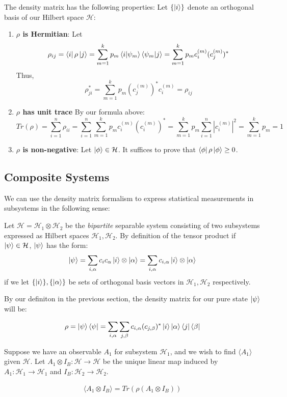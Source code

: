 \documentclass{../quantum.tex}
\begin{document}
The density matrix has the following properties: Let $\{\ket{i}\}$ denote an orthogonal basis of our Hilbert space $\mathcal{H}$:

\begin{enumerate}
  \item {\bf $\rho$ is Hermitian}: Let
  $$ \rho_{ij} = \bra{i}\rho\ket{j} = \sum_{m=1}^k p_m \bra{i}\ket{\psi_m} \bra{\psi_m}\ket{j} = \sum_{m=1}^k p_m c_i^{(m)} (c_j^{(m)})^*$$ Thus,
  $$ \rho_{ji}^* = \sum_{m=1}^k p_m (c_j^{(m)})^* c_i^{(m)} = \rho_{ij}  $$
  \item {\bf $\rho$ has unit trace} By our formula above:
  $$ Tr(\rho) = \sum_{i=1}^n \rho_{ii} = \sum_{i=1}^n\sum_{m=1}^k p_m c_{i}^{(m)}(c_{i}^{(m)})^* = \sum_{m=1}^k p_m \sum_{i=1}^n|c_i^{(m)}|^2 =
  \sum_{m=1}^k p_m = 1
  $$
  \item {\bf $\rho$ is non-negative}: Let $\ket{\phi} \in \mathcal{H}$. It suffices to prove that $\bra{\phi}\rho\ket{\phi} \geq 0$.
\end{enumerate}

\subsection{Composite Systems}

We can use the density matrix formalism to express statistical measurements in subsystems in the following sense:

Let $\mathcal{H} = \mathcal{H}_1 \otimes \mathcal{H}_2$ be the \textit{bipartite} separable system consisting of two subsystems expressed as Hilbert spaces $\mathcal{H}_1,\mathcal{H}_2$. By definition of the tensor product if $\ket{\psi} \in \mathcal{H}$, $\ket{\psi}$ has the form:
$$ \ket{\psi} = \sum_{i,\alpha} c_{i}c_{\alpha} \ket{i}\otimes\ket{\alpha} =  \sum_{i,\alpha} c_{i,\alpha} \ket{i}\otimes\ket{\alpha}$$
if we let $\{\ket{i}\},\{\ket{\alpha}\}$ be sets of orthogonal basis vectors in $\mathcal{H}_1,\mathcal{H}_2$ respectively.

By our definiton in the previous section, the density matrix for our pure state $\ket{\psi}$ will be:

$$ \rho = \ket{\psi}\bra{\psi} = \sum_{i,\alpha}\sum_{j,\beta} c_{i,\alpha}(c_{j,\beta})^*\ket{i}\ket{\alpha}\bra{j}\bra{\beta}$$

Suppose we have an observable $A_1$ for subsystem $\mathcal{H}_1$, and we wish to find $\langle A_1 \rangle$ given $\mathcal{H}$. Let $A_1 \otimes I_B: \mathcal{H} \rightarrow \mathcal{H}$ be the unique linear map induced by $A_1:\mathcal{H}_1 \rightarrow \mathcal{H}_1$ and $I_B: \mathcal{H}_2 \rightarrow \mathcal{H}_2$.

\begin{gather}
  \langle A_1 \otimes I_B \rangle = Tr(\rho(A_1 \otimes I_B))
\end{gather}
\end{document}
